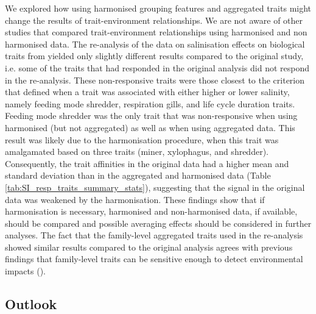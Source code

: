 \documentclass{article}
\begin{document}
We explored how using harmonised grouping features and aggregated traits might change the results of trait-environment relationships. We are not aware of other studies that compared trait-environment relationships using harmonised and non harmonised data. The re-analysis of the data on salinisation effects on biological traits from \citet{szocs_effects_2014} yielded only slightly different results compared to the original study, i.e. some of the traits that had responded in the original analysis did not respond in the re-analysis. These non-responsive traits were those closest to the criterion that defined when a trait was associated with either higher or lower salinity, namely feeding mode shredder, respiration gills, and life cycle duration traits. Feeding mode shredder was the only trait that was non-responsive when using harmonised (but not aggregated) as well as when using aggregated data. This result was likely due to the harmonisation procedure, when this trait was amalgamated based on three traits (miner, xylophagus, and shredder). Consequently, the trait affinities in the original data had a higher mean and standard deviation than in the aggregated and harmonised data (Table \ref{tab:SI_resp_traits_summary_stats}), suggesting that the signal in the original data was weakened by the harmonisation. %
These findings show that if harmonisation is necessary, harmonised and non-harmonised data, if available, should be compared and possible averaging effects should be considered in further analyses. The fact that the family-level aggregated traits used in the re-analysis showed similar results compared to the original analysis agrees with previous findings that family-level traits can be sensitive enough to detect environmental impacts (\cite{beketov_spear_2009}). 


\subsection*{Outlook}
\end{document}
